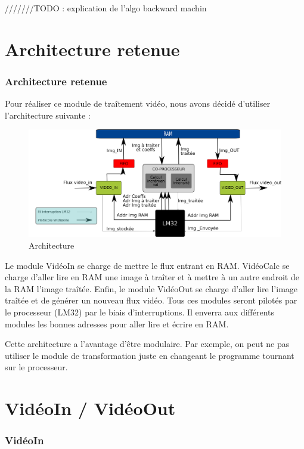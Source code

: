 \documentclass[a4paper,12pt]{report}
\begin{document}
{///////TODO : explication de l'algo backward machin}

	\part{Architecture retenue}
	\section*{Architecture retenue}
{Pour réaliser ce module de traîtement vidéo, nous avons décidé d'utiliser l'architecture suivante :
 
\begin{figure}[!h]
	\centering
	\includegraphics[scale = 0.1]{hardware-arch.png}
	\caption{Architecture}
\end{figure}

Le module VidéoIn se charge de mettre le flux entrant en RAM. VidéoCalc se charge d'aller lire en RAM une image à traîter et à mettre à un autre endroit de la RAM l'image traîtée. Enfin, le module VidéoOut se charge d'aller lire l'image traîtée et de générer un nouveau flux vidéo. Tous ces modules seront pilotés par le processeur (LM32) par le biais d'interruptions. Il enverra aux différents modules les bonnes adresses pour aller lire et écrire en RAM.


Cette architecture a l'avantage d'être modulaire. Par exemple, on peut ne pas utiliser le module de transformation juste en changeant le programme tournant sur le processeur.
}






    \part{VidéoIn / VidéoOut}

    \section*{VidéoIn}
\end{document}
